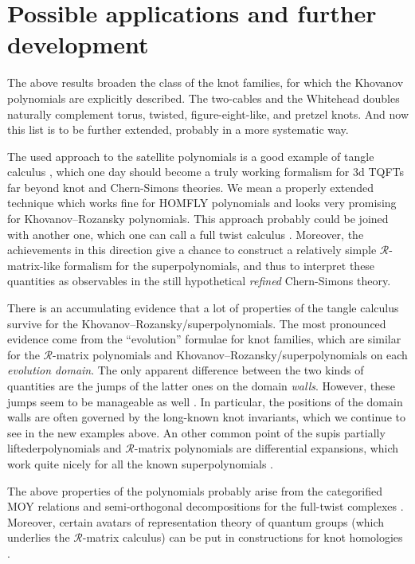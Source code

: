 \documentclass[11pt]{article}
\def\Rm{\mathcal{R}}
\begin{document}
\section{Possible applications and further development\label{sec:conc}}
The above results broaden the class of the knot families, for which the Khovanov polynomials are explicitly described. The two-cables and the Whitehead doubles naturally complement torus, twisted, figure-eight-like, and pretzel knots. And now this list is to be further extended, probably in a more systematic way. 


The used approach to the satellite polynomials is a good example of tangle calculus \cite{MMtopv,hyptangles},
which one day should become a truly working formalism for 3d TQFTs far beyond knot and Chern-Simons theories. We mean a properly extended technique which works fine for HOMFLY polynomials \cite{TanBl} 
and looks very promising for Khovanov--Rozansky \cite{KhRTang,LewLobbSl,LewLobbUp}  polynomials. This approach probably could be joined with another one, which one can call a full twist calculus \cite{NakFT,KalFT,catFT,torFT,GorFT}. Moreover, the achievements in this direction give a chance to construct a relatively simple $\Rm$-matrix-like formalism for the superpolynomials, and thus to interpret these quantities as observables in the still hypothetical {\it refined} Chern-Simons \cite{Kaul,RefCS} theory. 


There is an accumulating evidence that a lot of properties of the tangle calculus 
survive for the Khovanov--Rozansky/superpolynomials. The most pronounced evidence come from the ``evolution'' formulae for knot families, which are similar for the $\Rm$-matrix polynomials and Khovanov--Rozansky/superpolynomials on each \textit{evolution domain}. The only apparent difference between the two kinds of quantities are the jumps of the latter ones on the domain \textit{walls}. However, these jumps seem to be manageable as well \cite{DMMSS,EvoDiff,AMev,DBPev,APev}. In particular, the positions of the domain walls are often governed by the long-known knot invariants, which we continue to see in the new examples above. An other common point of the supis partially liftederpolynomials and $\Rm$-matrix polynomials are differential expansions, which work quite nicely for all the known superpolynomials \cite{RasmKhR,IndSup,EvoDiff,DiffBai}. 

The above properties of the polynomials probably arise from the categorified MOY relations \cite{MOY} and semi-orthogonal decompositions for the full-twist complexes \cite{Cop,catFT,KhRrec1,KhRrec2}. Moreover, certain avatars of representation theory of quantum groups (which underlies the $\Rm$-matrix calculus) can be put in constructions for knot homologies  \cite{QueRosCol,ParabKh, AnKh}. 
\end{document}
